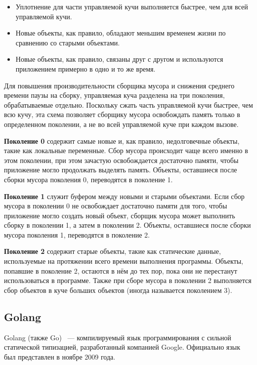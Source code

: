 \begin{itemize}[label*=---]
	\item Уплотнение для части управляемой кучи выполняется быстрее, чем для всей управляемой кучи.
	\item Новые объекты, как правило, обладают меньшим временем жизни по сравнению со старыми объектами.
	\item Новые объекты, как правило, связаны друг с другом и используются приложением примерно в одно и то же время.
\end{itemize}

Для повышения производительности сборщика мусора и снижения среднего времени паузы на сборку, управляемая куча разделена на три поколения, обрабатываемые отдельно. Поскольку сжать часть управляемой кучи быстрее, чем всю кучу, эта схема позволяет сборщику мусора освобождать память только в определенном поколении, а не во всей управляемой куче при каждом вызове.~\cite{dotnet_gc}~\cite{dotnet_memory}

\textbf{Поколение 0} содержит самые новые и, как правило, недолговечные объекты, такие как локальные переменные. Сбор мусора происходит чаще всего именно в этом поколении, при этом зачастую освобождается достаточно памяти, чтобы приложение могло продолжать выделять память. Объекты, оставшиеся после сборки мусора поколения 0, переводятся в поколение 1.

\textbf{Поколение 1} служит буфером между новыми и старыми объектами. Если сбор мусора в поколении 0 не освобождает достаточно памяти для того, чтобы приложение могло создать новый объект, сборщик мусора может выполнить сборку в поколении 1, а затем в поколении 2. Объекты, оставшиеся после сборки мусора поколения 1, переводятся в поколение 2.

\textbf{Поколение 2} содержит старые объекты, такие как статические данные, используемые на протяжении всего времени выполнения программы. Объекты, попавшие в поколение 2, остаются в нём до тех пор, пока они не перестанут использоваться в программе. Также при сборе мусора в поколении 2 выполняется сбор объектов в куче больших объектов (иногда называется поколением 3).

\subsection{Golang}

Golang (также Go)~\cite{golang} --- компилируемый язык программирования с сильной статической типизацией, разработанный компанией Google. Официально язык был представлен в ноябре 2009 года.

